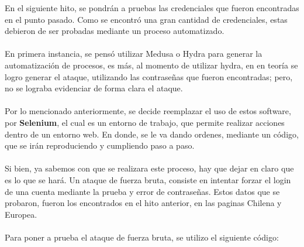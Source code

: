 \documentclass{article}
\begin{document}
En el siguiente hito, se pondrán a pruebas las credenciales que fueron encontradas en el punto pasado. Como se encontró una gran cantidad
de credenciales, estas debieron de ser probadas mediante un proceso automatizado.
\\\\
En primera instancia, se pensó utilizar Medusa o Hydra para generar la automatización de procesos, es más, al momento de utilizar hydra, en
en teoría se logro generar el ataque, utilizando las contraseñas que fueron encontradas; pero, no se lograba evidenciar de forma clara
el ataque. 
\\\\
Por lo mencionado anteriormente, se decide reemplazar el uso de estos software, por \textbf{Selenium}, el cual es un entorno de trabajo, que
permite realizar acciones dentro de un entorno web. En donde, se le va dando ordenes, mediante un código, que se irán reproduciendo y 
cumpliendo paso a paso.
\\\\
Si bien, ya sabemos con que se realizara este proceso, hay que dejar en claro que es lo que se hará. Un ataque de fuerza bruta, consiste en 
intentar forzar el login de una cuenta mediante la prueba y error de contraseñas. Estos datos que se probaron, fueron los encontrados en el hito
anterior, en las paginas Chilena y Europea.
\\\\
Para poner a prueba el ataque de fuerza bruta, se utilizo el siguiente código:
\end{document}
